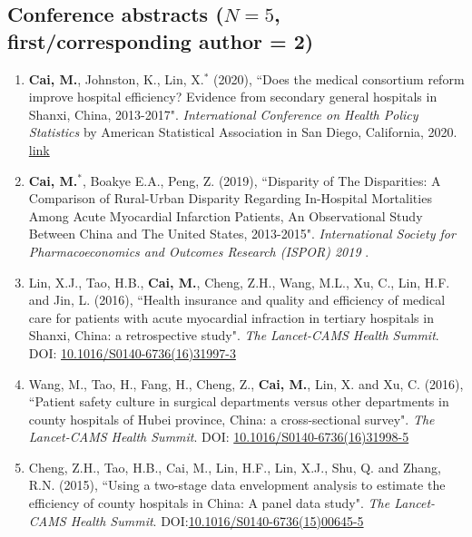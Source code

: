 \documentclass[11pt, a4paper]{article}
\newcommand{\years}[1]{\marginnote{\scriptsize #1}}
\begin{document}
	\subsection*{Conference abstracts ($N=5$, first/corresponding author = 2)}
	\begin{enumerate}[leftmargin=0ex,itemsep=1ex]
		\item \years{2020}\textbf{Cai, M.}, Johnston, K., Lin, X.$^\ast$ (2020), ``Does the medical consortium reform improve hospital efficiency? Evidence from secondary general hospitals in Shanxi, China, 2013-2017". \emph{International Conference on Health Policy Statistics} by American Statistical Association in San Diego, California, 2020. \href{https://ww2.amstat.org/meetings/ichps/2020/onlineprogram/AbstractDetails.cfm?AbstractID=306703}{link}
		
		\item \years{2019}\textbf{Cai, M.$^\ast$}, Boakye E.A., Peng, Z. (2019), ``Disparity of The Disparities: A Comparison of Rural-Urban Disparity Regarding In-Hospital Mortalities Among Acute Myocardial Infarction Patients, An Observational Study Between China and The United States, 2013-2015". \emph{International Society for Pharmacoeconomics and Outcomes Research (ISPOR) 2019 }. 
		
		\item \years{2016}Lin, X.J., Tao, H.B., \textbf{Cai, M.}, Cheng, Z.H., Wang, M.L., Xu, C., Lin, H.F. and Jin, L. (2016), ``Health insurance and quality and efficiency of medical care for patients with acute myocardial infraction in tertiary hospitals in Shanxi, China: a retrospective study". \emph{The Lancet-CAMS Health Summit}. DOI: \href{https://doi.org/10.1016/S0140-6736(16)31997-3}{10.1016/S0140-6736(16)31997-3}
		
		\item Wang, M., Tao, H., Fang, H., Cheng, Z., \textbf{Cai, M.}, Lin, X. and Xu, C. (2016), ``Patient safety culture in surgical departments versus other departments in county hospitals of Hubei province, China: a cross-sectional survey". \emph{The Lancet-CAMS Health Summit}. DOI: \href{https://doi.org/10.1016/S0140-6736(16)31998-5}{10.1016/S0140-6736(16)31998-5}
		
		\item \years{2015}Cheng, Z.H., Tao, H.B., Cai, M., Lin, H.F., Lin, X.J., Shu, Q. and Zhang, R.N. (2015), ``Using a two-stage data envelopment analysis to estimate the efficiency of county hospitals in China: A panel data study". \emph{The Lancet-CAMS Health Summit}. DOI:\href{https://doi.org/10.1016/S0140-6736(15)00645-5}{10.1016/S0140-6736(15)00645-5} 
	\end{enumerate}
\end{document}
